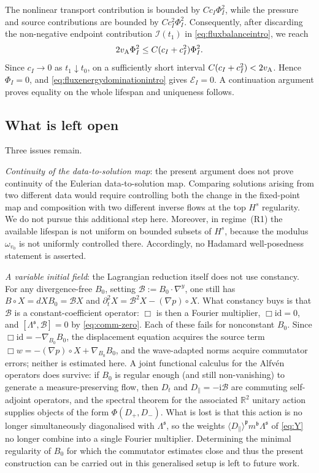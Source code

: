 \documentclass[11pt,reqno]{amsart}
\theoremstyle{plain}
\theoremstyle{definition}
\theoremstyle{remark}
\numberwithin{equation}{section}
\newcommand{\breg}{\mathfrak b}
\newcommand{\sreg}{\mathfrak s}
\newcommand{\preg}{\mathfrak p}
\newcommand{\Real}{\mathbb R}
\begin{document}
The nonlinear transport contribution is bounded by
$Cc_I\Phi_I^2$, while the pressure and source contributions are bounded by
$Cc_I^2\Phi_I^2$. Consequently, after discarding the non-negative endpoint contribution $\mathscr I(t_1)$ in \eqref{eq:fluxbalanceintro}, we reach 
\[
 2v_{\rm A}\Phi_I^2
 \le C(c_I+c_I^2)\Phi_I^2.
\]
Since $c_I\to0$ as $t_1\downarrow t_0$, on a sufficiently short interval
$C(c_I+c_I^2)<2v_{\rm A}$.  Hence $\Phi_I=0$, and
\eqref{eq:fluxenergydominationintro} gives $\mathcal E_I=0$.  A
continuation argument proves equality on the whole lifespan and uniqueness follows.


\subsection{What is left open} Three issues remain. 

\emph{Continuity of the data-to-solution map}: the present argument does not
prove continuity of the Eulerian data-to-solution map. Comparing solutions
arising from two different data would require controlling both the change in
the fixed-point map and composition with two different inverse flows at the
top $H^s$ regularity. We do not pursue this additional step here. Moreover, in
regime~\textup{(R1)} the available lifespan is not uniform on bounded subsets
of $H^s$, because the modulus $\omega_{v_0}$ is not uniformly controlled
there. Accordingly, no Hadamard well-posedness statement is asserted.

\emph{A variable initial field}: the Lagrangian reduction itself does not use
constancy.  For any divergence-free $B_0$, setting
$\mathcal B:=B_0\cdot\nabla^{y}$, one still has $B\circ X=dX B_0=\mathcal BX$
and $\partial_t^2X=\mathcal B^2X-(\nabla p)\circ X$.  What constancy buys is
that $\mathcal B$ is a constant-coefficient operator: $\Box$ is then a Fourier
multiplier, $\Box \mathrm{id}=0$, and $[\Lambda^{\sreg},\mathcal B]=0$ by
\eqref{eq:comm-zero}.  Each of these fails for nonconstant $B_0$.  Since
$\Box \mathrm{id}=-\nabla_{B_0}B_0$, the displacement equation acquires the
source term $\Box w=-(\nabla p)\circ X+\nabla_{B_0}B_0$, and the wave-adapted
norms acquire commutator errors; neither is estimated here.  A joint functional
calculus for the Alfv\'en operators does survive: if $B_0$ is regular enough (and still non-vanishing)
to generate a measure-preserving flow, then $D_t$ and
$D_{\parallel}=-\mathrm i\mathcal B$ are commuting self-adjoint operators, and
the spectral theorem for the associated $\Real^{2}$ unitary action supplies objects of the form $\Phi(D_+,D_-)$.  What is lost is that this action is no longer simultaneously
diagonalised with $\Lambda^{\sreg}$, so the weights
$\langle D_{\parallel}\rangle^{\preg}m^{\breg}\Lambda^{\sreg}$ of \eqref{eq:Y}
no longer combine into a single Fourier multiplier.  Determining the minimal
regularity of $B_0$ for which the commutator estimates close and thus the present construction can be carried out in this generalised setup is
left to future work.
\end{document}
